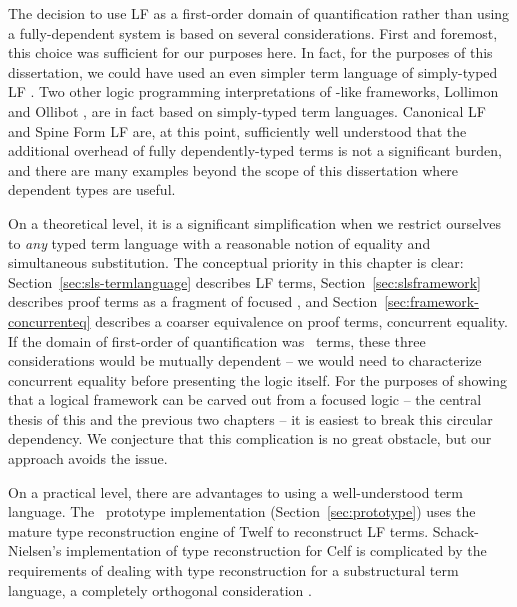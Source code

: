 The decision to use LF as a first-order domain of quantification
rather than using a fully-dependent system is based on several
considerations. First and foremost, this choice was sufficient for our
purposes here. In fact, for the purposes of this dissertation, we
could have used an even simpler term language of simply-typed LF
\cite{pfenning08church}. Two other logic programming interpretations
of \sls-like frameworks, Lollimon \cite{lopez05monadic} and Ollibot
\cite{pfenning09substructural}, are in fact based on simply-typed term
languages. Canonical LF and Spine Form LF are, at this point,
sufficiently well understood that the additional overhead of fully
dependently-typed terms is not a significant burden, and there are
many examples beyond the scope of this dissertation where dependent types are
useful.

On a theoretical level, it is a significant simplification when we
restrict ourselves to {\it any} typed term language with a reasonable
notion of equality and simultaneous substitution. The conceptual
priority in this chapter is clear: Section~\ref{sec:sls-termlanguage}
describes LF terms, Section~\ref{sec:slsframework} describes proof
terms as a fragment of focused \ollll, and
Section~\ref{sec:framework-concurrenteq} describes a coarser
equivalence on proof terms, concurrent equality. If the domain of
first-order of quantification was \sls~terms, these three
considerations would be mutually dependent -- we would need to
characterize concurrent equality before presenting the logic
itself. For the purposes of showing that a logical framework can be
carved out from a focused logic -- the central thesis of this and the
previous two chapters -- it is easiest to break this circular
dependency. We conjecture that this complication is no great obstacle,
but our approach avoids the issue.

On a practical level, there are advantages to using a well-understood
term language. The \sls~prototype implementation
(Section~\ref{sec:prototype}) uses the mature type reconstruction
engine of Twelf to reconstruct LF terms. Schack-Nielsen's
implementation of type reconstruction for Celf is complicated by the
requirements of dealing with type reconstruction for a substructural
term language, a completely orthogonal consideration \cite{schacknielsen08celf}. 

